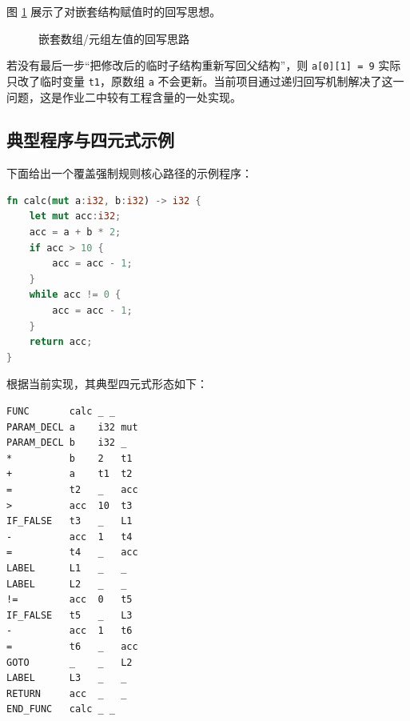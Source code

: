 \documentclass[UTF8,a4paper,12pt]{ctexart}
\newcommand{\pkg}[1]{\texttt{#1}}
\newcommand{\op}[1]{\texttt{#1}}
\begin{document}
图 \ref{fig:writeback-template} 展示了对嵌套结构赋值时的回写思想。

\begin{figure}[H]
    \centering
    \caption{嵌套数组/元组左值的回写思路}
    \label{fig:writeback-template}
\end{figure}

若没有最后一步“把修改后的临时子结构重新写回父结构”，则 \pkg{a[0][1] = 9} 实际只改了临时变量 \pkg{t1}，原数组 \pkg{a} 不会更新。当前项目通过递归回写机制解决了这一问题，这是作业二中较有工程含量的一处实现。

\subsection{典型程序与四元式示例}

下面给出一个覆盖强制规则核心路径的示例程序：

\begin{lstlisting}[language=Rust,caption={覆盖函数、赋值、if 与 while 的示例程序}]
fn calc(mut a:i32, b:i32) -> i32 {
    let mut acc:i32;
    acc = a + b * 2;
    if acc > 10 {
        acc = acc - 1;
    }
    while acc != 0 {
        acc = acc - 1;
    }
    return acc;
}
\end{lstlisting}

根据当前实现，其典型四元式形态如下：

\begin{lstlisting}[style=textStyle,caption={示例程序的典型四元式形态}]
FUNC       calc _ _
PARAM_DECL a    i32 mut
PARAM_DECL b    i32 _
*          b    2   t1
+          a    t1  t2
=          t2   _   acc
>          acc  10  t3
IF_FALSE   t3   _   L1
-          acc  1   t4
=          t4   _   acc
LABEL      L1   _   _
LABEL      L2   _   _
!=         acc  0   t5
IF_FALSE   t5   _   L3
-          acc  1   t6
=          t6   _   acc
GOTO       _    _   L2
LABEL      L3   _   _
RETURN     acc  _   _
END_FUNC   calc _ _
\end{lstlisting}
\end{document}
